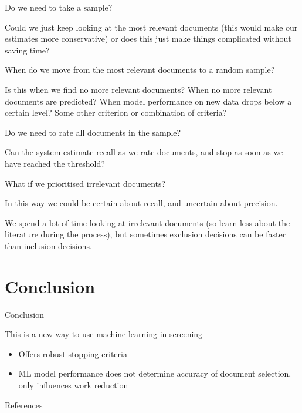 \documentclass[9pt]{beamer}
\makeatletter
\newcommand\listofframes{\@starttoc{lbf}}
\makeatother
\begin{document}
\begin{frame}{Do we need to take a sample?}

Could we just keep looking at the most relevant documents (this would make our estimates more conservative) or does this just make things complicated without saving time?

\end{frame}

\begin{frame}{When do we move from the most relevant documents to a random sample?}

Is this when we find no more relevant documents? When no more relevant documents are predicted? When model performance on new data drops below a certain level? Some other criterion or combination of criteria?

\end{frame}

\begin{frame}{Do we need to rate all documents in the sample?}

Can the system estimate recall as we rate documents, and stop as soon as we have reached the threshold?

\end{frame}

\begin{frame}{What if we prioritised irrelevant documents?}

In this way we could be certain about recall, and uncertain about precision.

\bigskip

We spend a lot of time looking at irrelevant documents (so learn less about the literature during the process), but sometimes exclusion decisions can be faster than inclusion decisions.

\end{frame}

\section{Conclusion}

\begin{frame}{Conclusion}

This is a new way to use machine learning in screening

\begin{itemize}
	\item<1-> Offers robust stopping criteria
	\item<2-> ML model performance does not determine accuracy of document selection, only influences work reduction
\end{itemize}

\end{frame}

\begin{frame}
\listofframes
\end{frame}

\begin{frame}{References}

\end{frame}
\end{document}
